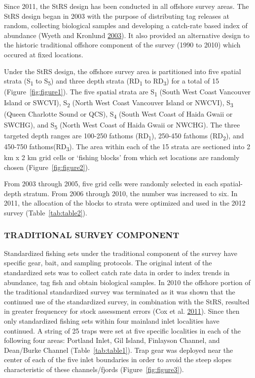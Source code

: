 \documentclass[12pt]{article}\usepackage[]{graphicx}\usepackage[]{color}
\begin{document}
Since 2011, the StRS design has been conducted in all offshore survey areas. The StRS design began in 2003 with the purpose of distributing tag releases at random, collecting biological samples and developing a catch-rate based index of abundance (Wyeth and Kronlund \protect\hyperlink{ref-Wyeth2003}{2003}). It also provided an alternative design to the historic traditional offshore component of the survey (1990 to 2010) which occured at fixed locations.

Under the StRS design, the offshore survey area is partitioned into five spatial strata (S\textsubscript{1} to S\textsubscript{5}) and three depth strata (RD\textsubscript{1} to RD\textsubscript{3}) for a total of 15 (Figure~\ref{fig:figure1}). The five spatial strata are S\textsubscript{1} (South West Coast Vancouver Island or SWCVI), S\textsubscript{2} (North West Coast Vancouver Island or NWCVI), S\textsubscript{3} (Queen Charlotte Sound or QCS), S\textsubscript{4} (South West Coast of Haida Gwaii or SWCHG), and S\textsubscript{5} (North West Coast of Haida Gwaii or NWCHG). The three targeted depth ranges are 100-250 fathoms (RD\textsubscript{1}), 250-450 fathoms (RD\textsubscript{2}), and 450-750 fathoms(RD\textsubscript{3}). The area within each of the 15 strata are sectioned into 2 km x 2 km grid cells or `fishing blocks' from which set locations are randomly chosen (Figure~\ref{fig:figure2}).

From 2003 through 2005, five grid cells were randomly selected in each spatial-depth stratum. From 2006 through 2010, the number was increased to six. In 2011, the allocation of the blocks to strata were optimized and used in the 2012 survey (Table~\ref{tab:table2}).

\hypertarget{traditional-survey-component}{%
\subsubsection{TRADITIONAL SURVEY COMPONENT}\label{traditional-survey-component}}

Standardized fishing sets under the traditional component of the survey have specific gear, bait, and sampling protocols. The original intent of the standardized sets was to collect catch rate data in order to index trends in abundance, tag fish and obtain biological samples. In 2010 the offshore portion of the traditional standardized survey was terminated as it was shown that the continued use of the standardized survey, in combination with the StRS, resulted in greater frequencey for stock assessment errors (Cox et al. \protect\hyperlink{ref-Cox2011}{2011}). Since then only standardized fishing sets within four mainland inlet localities have continued. A string of 25 traps were set at five specific localities in each of the following four areas: Portland Inlet, Gil Island, Finlayson Channel, and Dean/Burke Channel (Table~\ref{tab:table1}). Trap gear was deployed near the center of each of the five inlet boundaries in order to avoid the steep slopes characteristic of these channels/fjords (Figure~\ref{fig:figure3}).
\end{document}
